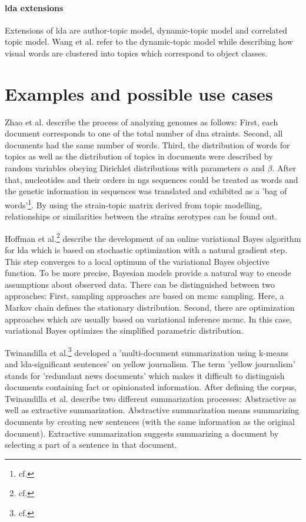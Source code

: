 \paragraph{\ac{lda} extensions}

Extensions of \ac{lda} are author-topic model, dynamic-topic model and correlated topic model. Wang et al. refer to the dynamic-topic model while describing how visual words are clustered into topics which correspond to object classes.
 
\section{Examples and possible use cases}\label{lda_examples}

Zhao et al. describe the process of analyzing genomes as follows: First, each document corresponds to one of the total number of \ac{dna} straints. Second, all documents had the same number of words. Third, the distribution of words for topics as well as the distribution of topics in documents were described by random variables obeying Dirichlet distributions with parameters $\alpha$ and $\beta$. After that, nucleotides and their orders in \ac{ngs} sequences could be treated as words and the genetic information in sequences was translated and exhibited as a 'bag of words'\footnote{cf.\autocite{zhao_2016}}. By using the strain-topic matrix derived from topic modelling, relationships or similarities between the strains serotypes can be found out. 

Hoffman et al.\footnote{cf.\autocite{hoffman_2010}} describe the development of an online variational Bayes algorithm for \ac{lda} which is based on stochastic optimization with a natural gradient step. This step converges to a local optimum of the variational Bayes objective function.
To be more precise, Bayesian models provide a natural way to encode assumptions about observed data.
There can be distinguished between two approaches: First, sampling approaches are based on \ac{mcmc} sampling. Here, a Markov chain defines the stationary distribution.
Second, there are optimization approaches which are usually based on variational inference \ac{mcmc}. In this case, variational Bayes optimizes the simplified parametric distribution.

Twinandilla et al.\footnote{cf.\autocite{twinandilla_2018}} developed a 'multi-document summarization using k-means and \ac{lda}-significant sentences' on yellow journalism. The term 'yellow journalism' stands for 'redundant news documents' which makes it difficult to distinguish documents containing fact or opinionated information. After defining the corpus, Twinandilla et al. describe two different summarization processes: Abstractive as well as extractive summarization. Abstractive summarization means summarizing documents by creating new sentences (with the same information as the original document). Extractive summarization suggests summarizing a document by selecting a part of a sentence in that document.

